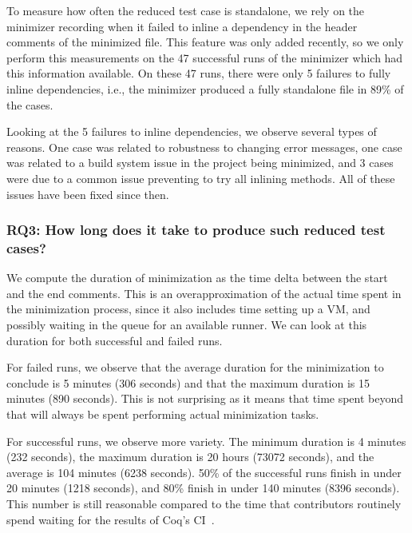 \documentclass[a4paper,USenglish,cleveref,autoref,thm-restate]{lipics-v2021}
\begin{document}
To measure how often the reduced test case is standalone, we rely on the minimizer recording when it failed to inline a dependency in the header comments of the minimized file. This feature was only added recently, so we only perform this measurements on the 47 successful runs of the minimizer which had this information available.
On these 47 runs, there were only 5 failures to fully inline dependencies, i.e., the minimizer produced a fully standalone file in 89\% of the cases.

Looking at the 5 failures to inline dependencies, we observe several types of reasons. One case was related to robustness to changing error messages, one case was related to a build system issue in the project being minimized, and 3 cases were due to a common issue preventing to try all inlining methods. All of these issues have been fixed since then.

\subsubsection{RQ3: How long does it take to produce such reduced test cases?}

We compute the duration of minimization as the time delta between the start and the end comments.
This is an overapproximation of the actual time spent in the minimization process, since it also includes time setting up a VM, and possibly waiting in the queue for an available runner.
%
We can look at this duration for both successful and failed runs.

For failed runs, we observe that the average duration for the minimization to conclude is 5 minutes (306 seconds) and that the maximum duration is 15 minutes (890 seconds). This is not surprising as it means that time spent beyond that will always be spent performing actual minimization tasks.

For successful runs, we observe more variety. The minimum duration is 4 minutes (232 seconds), the maximum duration is 20 hours (73072 seconds), and the average is 104 minutes (6238 seconds). 50\% of the successful runs finish in under 20 minutes (1218 seconds), and 80\% finish in under 140 minutes (8396 seconds). This number is still reasonable compared to the time that contributors routinely spend waiting for the results of Coq's CI~\cite{zimmermann:tel-02451322}.
\end{document}
